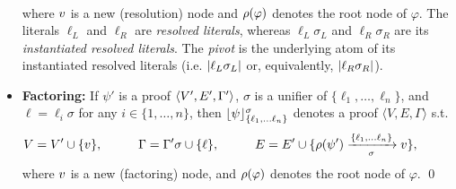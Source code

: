 \begin{definition}
\begin{itemize}
\begin{align*}
\end{align*}
    where $v$ is a new (resolution) node and $\rho(\varphi)$ denotes the root node of $\varphi$.  The literals $\ell_L$ and $\ell_R$ are \emph{resolved literals}, whereas $\ell_L \sigma_L$ and $\ell_R \sigma_R$ are its \emph{instantiated resolved literals}. The \emph{pivot} is the underlying atom of its instantiated resolved literals (i.e. $\lvert\ell_L \sigma_L\rvert$ or, equivalently, $\lvert\ell_R \sigma_R\rvert$).
  \item \textbf{Factoring:}
  If $\psi'$ is a proof $\langle V', E', \Gamma' \rangle$, $\sigma$ is a unifier of $\{\ell_1,\ldots,\ell_n\}$, and $\ell=\ell_i\sigma$ for any $i\in \{1,\ldots,n\}$, then $\lfloor \psi \rfloor_{\{\ell_1, \ldots \ell_n\}}^{\sigma}$ denotes a proof $\langle V, E, \Gamma \rangle$ s.t.
    \begin{align*}
         \hspace{-0.6cm} V &= V' \cup \{\n \},  \hspace*{1cm} \Gamma = \clause' \sigma \cup \{ \ell \}, \hspace*{1cm}  E = E' \cup \{ \raiz{\psi'} \xrightarrow[\sigma]{\{\ell_1, \ldots \ell_n\}} \n \},
    \end{align*}  
    where $v$ is a new (factoring) node, and $\rho(\varphi)$ denotes the root node of $\varphi$.
  \qed
\end{itemize}
\end{definition}






